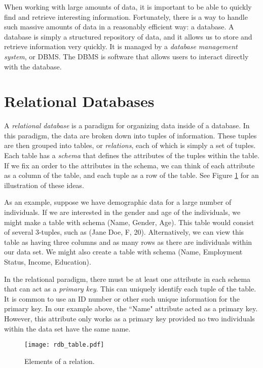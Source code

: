 \newcommand{\lsql}[1]{\lstinline[language=SQL,prebreak=]!#1!}

\label{lab:sql_rdb}

When working with large amounts of data, it is important to be able to quickly find and retrieve interesting information.
Fortunately, there is a way to handle such massive amounts of data in a reasonably efficient way: a database.
A database is simply a structured repository of data, and it allows us to store and retrieve information very quickly.
It is managed by a \emph{database management system}, or DBMS.
The DBMS is software that allows users to interact directly with the database.

\section*{Relational Databases}
A \emph{relational database} is a paradigm for organizing data inside of a database.
In this paradigm, the data are broken down into tuples of information.
These tuples are then grouped into tables, or \emph{relations}, each of which is simply a set of tuples.
Each table has a \emph{schema} that defines the attributes of the tuples within the table.
If we fix an order to the attributes in the schema, we can think of each attribute as a column
of the table, and each tuple as a row of the table. See Figure \ref{fig:relation} for an illustration of
these ideas.

As an example, suppose we have demographic data for a large number of individuals.
If we are interested in the gender and age of the individuals, we might make a table
with schema (Name, Gender, Age). This table would consist of several 3-tuples, such as
(Jane Doe, F, 20). Alternatively, we can view this table as having three columns
and as many rows as there are individuals within our data set.
We might also create a table with schema (Name, Employment Status, Income, Education).

In the relational paradigm, there must be at least one attribute in each schema that can act as a \emph{primary key}.
This can uniquely identify each tuple of the table.
It is common to use an ID number or other such unique information for the primary key.
In our example above, the ``Name" attribute acted as a primary key. However, this attribute only works as a primary
key provided no two individuals within the data set have the same name.
\begin{figure}
\centering
\texttt{[image: rdb\_table.pdf]}
\caption{Elements of a relation.}
\label{fig:relation}
\end{figure}

